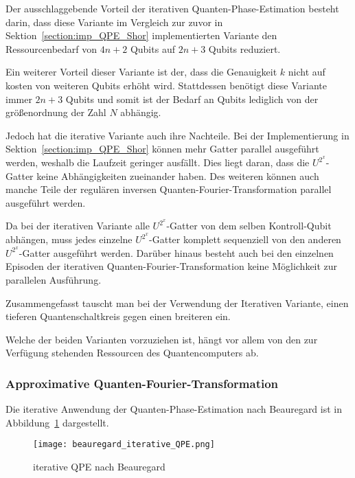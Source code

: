 Der ausschlaggebende Vorteil der iterativen Quanten-Phase-Estimation besteht darin, 
dass diese Variante im Vergleich zur zuvor in Sektion~\ref{section:imp_QPE_Shor} implementierten Variante den Ressourcenbedarf von \(4n+2\) Qubits auf \(2n+3\) Qubits reduziert.

Ein weiterer Vorteil dieser Variante ist der, 
dass die Genauigkeit \(k\) nicht auf kosten von weiteren Qubits erhöht wird.
Stattdessen benötigt diese Variante immer \(2n+3\) Qubits und 
somit ist der Bedarf an Qubits lediglich von der größenordnung der Zahl \(N\) abhängig.

Jedoch hat die iterative Variante auch ihre Nachteile.
Bei der Implementierung in Sektion~\ref{section:imp_QPE_Shor} können mehr Gatter parallel ausgeführt werden, 
weshalb die Laufzeit geringer ausfällt.
Dies liegt daran, dass die \(U^{2^x}\)-Gatter keine Abhängigkeiten zueinander haben. 
Des weiteren können auch manche Teile der regulären inversen Quanten-Fourier-Transformation parallel ausgeführt werden.

Da bei der iterativen Variante alle \(U^{2^x}\)-Gatter von dem selben Kontroll-Qubit abhängen, 
muss jedes einzelne \(U^{2^x}\)-Gatter komplett sequenziell von den anderen \(U^{2^x}\)-Gatter ausgeführt werden.
Darüber hinaus besteht auch bei den einzelnen Episoden der iterativen Quanten-Fourier-Transformation keine Möglichkeit zur parallelen Ausführung.

Zusammengefasst tauscht man bei der Verwendung der Iterativen Variante, 
einen tieferen Quantenschaltkreis gegen einen breiteren ein.

Welche der beiden Varianten vorzuziehen ist, 
hängt vor allem von den zur Verfügung stehenden Ressourcen des Quantencomputers ab.



\subsubsection{Approximative Quanten-Fourier-Transformation}
Die iterative Anwendung der Quanten-Phase-Estimation nach Beauregard ist in Abbildung~\ref{fig:iterative_iQFT_Beauregard} dargestellt.

\vspace{1em}
\begin{figure} [H]
  \caption{iterative QPE nach Beauregard}
  \label{fig:iterative_iQFT_Beauregard}
  \texttt{[image: beauregard\_iterative\_QPE.png]}
  \centering
  \end{figure}





